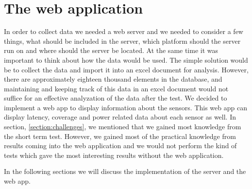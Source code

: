 \documentclass[USenglish]{ifimaster}  %
\begin{document}
\begin{table}[H]
\centering
{}
\caption{\textbf{nbiot\_labtest\_details.py} parameters. See \href{https://github.com/henninghaakonsen/thesis/blob/master/code/nbiot_labtest_details.py}{\acrshort{nb-iot} details}\cite{code:nbiotdetails} for complete code}
\label{table:nbiotdetails}
\end{table}

\chapter{The web application} \label{chapter:webapp}
In order to collect data we needed a web server and we needed to consider a few things, what should be included in the server, which platform should the server run on and where should the server be located. At the same time it was important to think about how the data would be used. The simple solution would be to collect the data and import it into an excel document for analysis. However, there are approximately eighteen thousand elements in the database, and maintaining and keeping track of this data in an excel document would not suffice for an effective analyzation of the data after the test. We decided to implement a web app to display information about the sensors. This web app can display latency, coverage and power related data about each sensor as well. In section, \vref{section:challenges}, we mentioned that we gained most knowledge from the short term test. However, we gained most of the practical knowledge from results coming into the web application and we would not perform the kind of tests which gave the most interesting results without the web application.

In the following sections we will discuss the implementation of the server and the web app.
\end{document}
